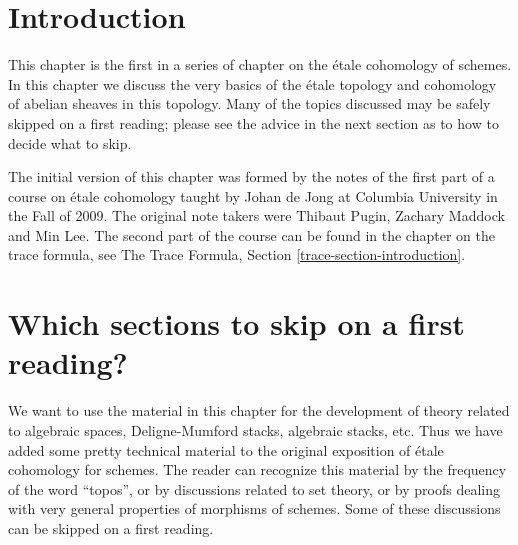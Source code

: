 \section{Introduction}
\label{etale-cohomology-section-introduction}
This chapter is the first in a series of chapter on the \'etale cohomology
of schemes. In this chapter we discuss the very basics of the \'etale
topology and cohomology of abelian sheaves in this topology. Many of the
topics discussed may be safely skipped on a first reading; please see
the advice in the next section as to how to decide what to skip.

\medskip\noindent
The initial version of this chapter was formed by the notes
of the first part of a course on \'etale cohomology taught by Johan de Jong
at Columbia University in the Fall of 2009. The original note takers were
Thibaut Pugin, Zachary Maddock and Min Lee. The second part of the
course can be found in the chapter on the trace formula, see
The Trace Formula, Section \ref{trace-section-introduction}.

\section{Which sections to skip on a first reading?}
\label{etale-cohomology-section-skip}
We want to use the material in this chapter for the development of
theory related to algebraic spaces, Deligne-Mumford stacks, algebraic stacks,
etc. Thus we have added some pretty technical material to the original
exposition of \'etale cohomology for schemes. The reader can recognize this
material by the frequency of the word ``topos'', or by discussions related
to set theory, or by proofs dealing with very general properties of morphisms
of schemes. Some of these discussions can be skipped on a first reading.

